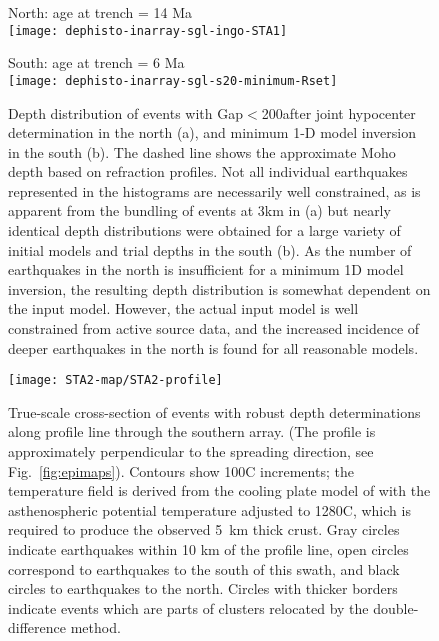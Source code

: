\documentclass[reviewcopy]{elsart}
\renewcommand{\includegraphics}[2][]{\fbox{#2}}
\begin{document}
\begin{figure}

\begin{minipage}[t]{0.49\textwidth}
{ North: age at trench = 14 Ma} \\
\texttt{[image: dephisto-inarray-sgl-ingo-STA1]}
\end{minipage}\hfill%
\begin{minipage}[t]{0.49\textwidth}
{ South: age at trench = 6 Ma} \\
\texttt{[image: dephisto-inarray-sgl-s20-minimum-Rset]}
\end{minipage}


\caption{Depth distribution of events with
  Gap$<$200\dg after  joint
  hypocenter determination in the north (a), and minimum 1-D model
inversion in the south (b). The
  dashed line shows the approximate Moho depth based on refraction
profiles. 
Not all individual earthquakes represented in the
  histograms are necessarily well constrained, as is apparent from the
  bundling of events at 3km in (a) but nearly identical depth distributions were
  obtained for a large variety of initial models and trial depths in
  the south
  (b).  As the number of earthquakes in the north is insufficient for
  a minimum 1D model inversion, the resulting depth distribution is
  somewhat dependent on the input model.  However, the actual input model
  is well constrained from active source data, and the increased
  incidence of deeper earthquakes in the north is found for all
  reasonable models. 
} 
\label{fig:dephistos}
\end{figure}


\begin{figure}
\centering
\texttt{[image: STA2-map/STA2-profile]}
\caption{True-scale cross-section of events with robust depth determinations along
  profile line through the southern array. (The profile is
  approximately perpendicular to the spreading direction, see Fig.~\ref{fig:epimaps}). Contours show 100\dg C increments; the temperature field is derived
  from the cooling plate model of \citet{mckenzie05} with the
  asthenospheric potential temperature adjusted to 1280\dg C, which is
  required to produce the observed 5~km thick crust. Gray circles
  indicate earthquakes within 10 km of the profile line, open circles
  correspond to earthquakes to the south of this swath, and black circles to
  earthquakes to the north. Circles with thicker borders indicate
  events which are parts of clusters relocated by the
  double-difference method.
}
\label{fig:profiles}
\end{figure}
\end{document}

